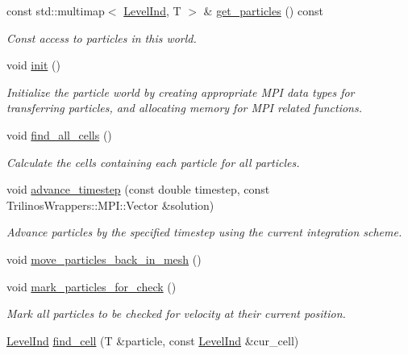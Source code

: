 \begin{DoxyCompactItemize}
const std\+::multimap$<$ \hyperlink{namespaceps__mmm_1_1_particle_a475174140997ceb63cc9e801b6c0c4b8}{Level\+Ind}, T $>$ \& \hyperlink{classps__mmm_1_1_particle_1_1_world_a27f16128b40b4645ccebac61e4181d8a}{get\+\_\+particles} () const 
\begin{DoxyCompactList}\small\item\em Const access to particles in this world. \end{DoxyCompactList}\item 
void \hyperlink{classps__mmm_1_1_particle_1_1_world_a01461b9dc0afe272511be2bc63456bda}{init} ()
\begin{DoxyCompactList}\small\item\em Initialize the particle world by creating appropriate M\+P\+I data types for transferring particles, and allocating memory for M\+P\+I related functions. \end{DoxyCompactList}\item 
void \hyperlink{classps__mmm_1_1_particle_1_1_world_a0610b2299ee449bf9ba13207c80d39b4}{find\+\_\+all\+\_\+cells} ()
\begin{DoxyCompactList}\small\item\em Calculate the cells containing each particle for all particles. \end{DoxyCompactList}\item 
void \hyperlink{classps__mmm_1_1_particle_1_1_world_ad49f2b38ad1863083c1a5653ac4bbaec}{advance\+\_\+timestep} (const double timestep, const Trilinos\+Wrappers\+::\+M\+P\+I\+::\+Vector \&solution)
\begin{DoxyCompactList}\small\item\em Advance particles by the specified timestep using the current integration scheme. \end{DoxyCompactList}\item 
void \hyperlink{classps__mmm_1_1_particle_1_1_world_a344ae5e1fb098dceb2eee132e27ee49b}{move\+\_\+particles\+\_\+back\+\_\+in\+\_\+mesh} ()
\item 
void \hyperlink{classps__mmm_1_1_particle_1_1_world_a2ce89d57244a0eb9534b926ab81ac2b5}{mark\+\_\+particles\+\_\+for\+\_\+check} ()
\begin{DoxyCompactList}\small\item\em Mark all particles to be checked for velocity at their current position. \end{DoxyCompactList}\item 
\hyperlink{namespaceps__mmm_1_1_particle_a475174140997ceb63cc9e801b6c0c4b8}{Level\+Ind} \hyperlink{classps__mmm_1_1_particle_1_1_world_a830d70de69cc6d8051bb3369a151f0f6}{find\+\_\+cell} (T \&particle, const \hyperlink{namespaceps__mmm_1_1_particle_a475174140997ceb63cc9e801b6c0c4b8}{Level\+Ind} \&cur\+\_\+cell)

\end{DoxyCompactItemize}
